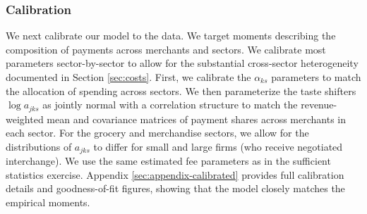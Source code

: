 \documentclass[main.tex]{subfiles}
\begin{document}
\subsubsection{Calibration}

We next calibrate our model to the data.
We target moments describing the composition of payments across merchants and sectors.
We calibrate most parameters sector-by-sector to allow for the substantial cross-sector heterogeneity documented in Section \ref{sec:costs}.
First, we calibrate the $\alpha_{ks}$ parameters to match the allocation of spending across sectors.
We then parameterize the taste shifters $\log a_{jks}$ as jointly normal with a correlation structure to match the revenue-weighted mean and covariance matrices of payment shares across merchants in each sector.
For the grocery and merchandise sectors, we allow for the distributions of $a_{jks}$ to differ for small and large firms (who receive negotiated interchange).
We use the same estimated fee parameters as in the sufficient statistics exercise.
Appendix \ref{sec:appendix-calibrated} provides full calibration details and goodness-of-fit figures, showing that the model closely matches the empirical moments.
\end{document}
